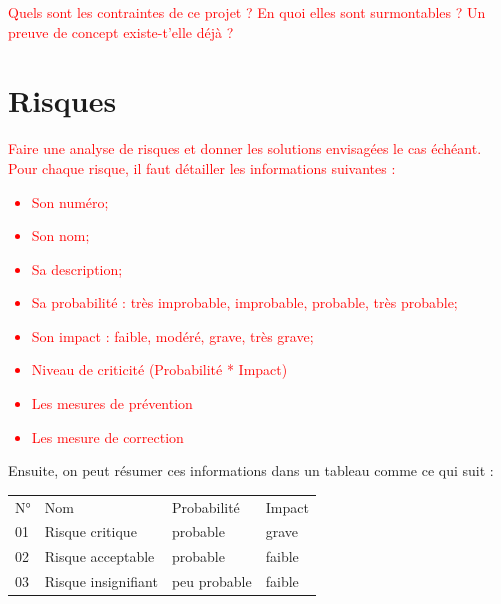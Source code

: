 \textcolor{red} 
{
Quels sont les contraintes de ce projet ? En quoi elles sont surmontables ? Un preuve de concept existe-t'elle déjà ?
}

\section{Risques}
\textcolor{red} 
{
  Faire une analyse de risques et donner les solutions envisagées le cas échéant.
  Pour chaque risque, il faut détailler les informations suivantes :
  \begin{itemize}
    \item Son numéro;
    \item Son nom;
    \item Sa description;
    \item Sa probabilité : très improbable, improbable, probable, très probable;
    \item Son impact :  faible, modéré, grave, très grave;
    \item Niveau de criticité (Probabilité * Impact)
    \item Les mesures de prévention
    \item Les mesure de correction
  \end{itemize}
}

Ensuite, on peut résumer ces informations dans un tableau comme ce qui suit :

\begin{tabular}{ | l | l | l | l | }
  N° & Nom & Probabilité & Impact \\
  \rowcolor{red!60}
  01 & Risque critique & probable & grave \\
  \rowcolor{red!20}
  02 & Risque acceptable & probable & faible \\
  03 & Risque insignifiant & peu probable & faible
\end{tabular}
